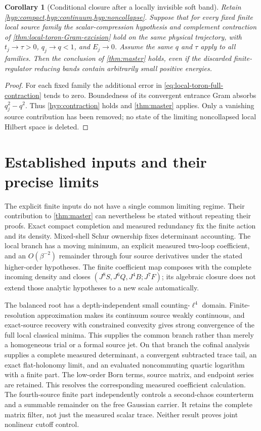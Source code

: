 \documentclass[11pt,oneside,openany]{book}
\newtheorem{corollary}[corollary]{Corollary}
\theoremstyle{definition}
\theoremstyle{remark}
\begin{document}
\begin{corollary}[Conditional closure after a locally invisible soft band]
\label{cor:closure-local-soft-band}
Retain \cref{hyp:compact,hyp:continuum,hyp:noncollapse}. Suppose
that for every fixed finite local source family the scalar-compression
hypothesis and complement contraction of
\cref{thm:local-toron-Gram-excision} hold on the same physical
trajectory, with $t_j\to\tau>0$, $q_j\to q<1$, and $E_j\to0$.
Assume the same $q$ and $\tau$ apply to all families. Then the
conclusion of \cref{thm:master} holds, even if the discarded
finite-regulator reducing bands contain arbitrarily small positive
energies.
\end{corollary}
\begin{proof}
For each fixed family the additional error in
\cref{eq:local-toron-full-contraction} tends to zero. Boundedness
of its convergent entrance Gram absorbs $q_j^2-q^2$. Thus
\cref{hyp:contraction} holds and \cref{thm:master} applies.
Only a vanishing source contribution has been removed; no state of
the limiting noncollapsed local Hilbert space is deleted.
\end{proof}

\section{Established inputs and their precise limits}
The explicit finite inputs do not have a single common limiting
regime. Their contribution to \cref{thm:master} can nevertheless be
stated without repeating their proofs. Exact compact completion and
measured redundancy fix the finite action and its density. Mixed-shell
Schur ownership fixes determinant accounting. The local branch has a
moving minimum, an explicit measured two-loop coefficient, and an
$O(\beta^{-2})$ remainder through four source derivatives under the
stated higher-order hypotheses. The finite coefficient map composes
with the complete incoming density and closes
$(J^8S,J^6Q,J^4B;J^7F)$; its algebraic closure does not extend those
analytic hypotheses to a new scale automatically.

The balanced root has a depth-independent small counting-$\ell^4$
domain. Finite-resolution approximation makes its continuum source
weakly continuous, and exact-source recovery with constrained
convexity gives strong convergence of the full local classical
minima. This supplies the common branch rather than merely a
homogeneous trial or a formal source jet. On that branch the cofinal
analysis supplies a complete measured determinant, a convergent
subtracted trace tail, an exact flat-holonomy limit, and an evaluated
noncommuting quartic logarithm with a finite part. The low-order Born terms, source matrix, and endpoint series
are retained. This resolves the corresponding measured coefficient
calculation. The fourth-source finite part independently controls a
second-chaos counterterm and a summable remainder on the free
Gaussian carrier. It retains the complete matrix filter, not just
the measured scalar trace. Neither result proves joint nonlinear
cutoff control.
\end{document}
